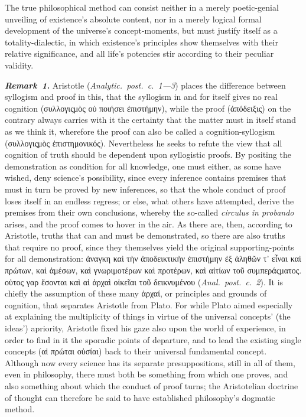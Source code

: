 \documentclass[12pt]{book}
\newcommand{\anm}[1]{\emph{\textbf{Remark~#1.}}}
\begin{document}
The true philosophical method can consist neither in a merely poetic-genial
unveiling of existence's absolute content, nor in a merely logical formal
development of the universe's concept-moments, but must justify itself as a
totality-dialectic, in which existence's principles show themselves with
their relative significance, and all life's potencies stir according to
their peculiar validity.

\anm{1} Aristotle (\textit{Analytic.\ post.\ c.\ 1---3}) places the
difference between syllogism and proof in this, that the syllogism in and
for itself gives no real cognition (συλλογιςμὸς οὐ ποιήσει ἐπιστήμην),
while the proof (ἀπόδειξις) on the contrary always carries with it the
certainty that the matter must in itself stand as we think it, wherefore the
proof can also be called a cognition-syllogism (συλλογιςμὸς ἐπιστημονικός).
Nevertheless he seeks to refute the view that all cognition of truth should
be dependent upon syllogistic proofs. By positing the demonstration as
condition for all knowledge, one must either, as some have wished, deny
science's possibility, since every inference contains premises that must in
turn be proved by new inferences, so that the whole conduct of proof loses
itself in an endless regress; or else, what others have attempted, derive
the premises from their own conclusions, whereby the so-called
\textit{circulus in probando} arises, and the proof comes to hover in the
air. As there are, then, according to Aristotle, truths that can and must be
demonstrated, so there are also truths that require no proof, since they
themselves yield the original supporting-points for all demonstration:
ἀναγκη καὶ τὴν ἀποδεικτικὴν ἐπιστήμην ἐξ ἀληθῶν τ' εἶναι καὶ πρώτων, καὶ
ἀμέσων, καὶ γνωριμοτέρων καὶ προτέρων, καὶ αἰτίων τοῦ συμπεράςματος. οὑτος
γαρ ἔσονται καὶ αἱ ἀρχαὶ οἰκεῖαι τοῦ δεικνυμένου (\textit{Anal.\ post.\ c.\
2}). It is chiefly the assumption of these many ἀρχαί, or principles and
grounds of cognition, that separates Aristotle from Plato. For while Plato
aimed especially at explaining the multiplicity of things in virtue of the
universal concepts' (the ideas') apriority, Aristotle fixed his gaze also
upon the world of experience, in order to find in it the sporadic points of
departure, and to lead the existing single concepts (αἱ πρώται οὐσίαι) back
to their universal fundamental concept. Although now every science has its
separate presuppositions, still in all of them, even in philosophy, there
must both be something from which one proves, and also something about which
the conduct of proof turns; the Aristotelian doctrine of thought can
therefore be said to have established philosophy's dogmatic method.
\end{document}
